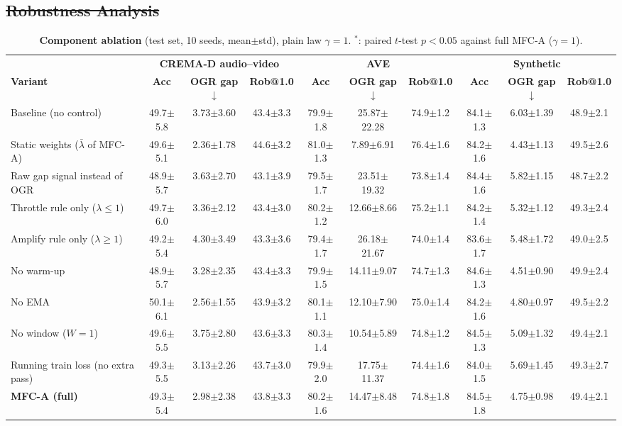 \documentclass[fleqn,10pt]{wlscirep}
\newcommand{\pmm}{$\pm$} %
\providecommand{\DIFdel}[1]{{\protect\color{red}\sout{#1}}} %
\providecommand{\DIFaddbegin}{} %
\providecommand{\DIFdelbegin}{} %
\providecommand{\DIFdelend}{} %
\begin{document}
\DIFdelbegin \subsection{\DIFdel{Robustness Analysis}}
\addtocounter{subsection}{-1}%
\DIFdelend \DIFaddbegin \begin{table}[t]
\caption{\textbf{Component ablation} (test set, 10 seeds, mean\pmm std), plain law $\gamma{=}1$. $^{*}$: paired $t$-test $p<0.05$ against full MFC-A ($\gamma{=}1$).}
\label{tab:ablation}
\centering
\footnotesize
\setlength{\tabcolsep}{3pt}
\begin{tabular}{@{}lccc@{\hskip 8pt}ccc@{\hskip 8pt}ccc@{}}
\toprule
& \multicolumn{3}{c}{\textbf{CREMA-D audio--video}} & \multicolumn{3}{c}{\textbf{AVE}} & \multicolumn{3}{c}{\textbf{Synthetic}} \\
\cmidrule(lr){2-4}\cmidrule(lr){5-7}\cmidrule(lr){8-10}
\textbf{Variant} & \textbf{Acc} & \textbf{OGR gap}$\downarrow$ & \textbf{Rob@1.0} & \textbf{Acc} & \textbf{OGR gap}$\downarrow$ & \textbf{Rob@1.0} & \textbf{Acc} & \textbf{OGR gap}$\downarrow$ & \textbf{Rob@1.0} \\ \midrule
Baseline (no control) & 49.7$\pm$5.8 & 3.73$\pm$3.60 & 43.4$\pm$3.3 & 79.9$\pm$1.8 & 25.87$\pm$22.28 & 74.9$\pm$1.2 & 84.1$\pm$1.3 & 6.03$\pm$1.39 & 48.9$\pm$2.1 \\
Static weights ($\bar\lambda$ of MFC-A) & 49.6$\pm$5.1 & 2.36$\pm$1.78 & 44.6$\pm$3.2 & 81.0$\pm$1.3 & 7.89$\pm$6.91 & 76.4$\pm$1.6 & 84.2$\pm$1.6 & 4.43$\pm$1.13 & 49.5$\pm$2.6 \\
Raw gap signal instead of OGR & 48.9$\pm$5.7 & 3.63$\pm$2.70 & 43.1$\pm$3.9 & 79.5$\pm$1.7 & 23.51$\pm$19.32 & 73.8$\pm$1.4 & 84.4$\pm$1.6 & 5.82$\pm$1.15 & 48.7$\pm$2.2 \\
Throttle rule only ($\lambda\le1$) & 49.7$\pm$6.0 & 3.36$\pm$2.12 & 43.4$\pm$3.0 & 80.2$\pm$1.2 & 12.66$\pm$8.66 & 75.2$\pm$1.1 & 84.2$\pm$1.4 & 5.32$\pm$1.12 & 49.3$\pm$2.4 \\
Amplify rule only ($\lambda\ge1$) & 49.2$\pm$5.4 & 4.30$\pm$3.49 & 43.3$\pm$3.6 & 79.4$\pm$1.7 & 26.18$\pm$21.67 & 74.0$\pm$1.4 & 83.6$\pm$1.7 & 5.48$\pm$1.72 & 49.0$\pm$2.5 \\
No warm-up & 48.9$\pm$5.7 & 3.28$\pm$2.35 & 43.4$\pm$3.3 & 79.9$\pm$1.5 & 14.11$\pm$9.07 & 74.7$\pm$1.3 & 84.6$\pm$1.3 & 4.51$\pm$0.90 & 49.9$\pm$2.4 \\
No EMA & 50.1$\pm$6.1 & 2.56$\pm$1.55 & 43.9$\pm$3.2 & 80.1$\pm$1.1 & 12.10$\pm$7.90 & 75.0$\pm$1.4 & 84.2$\pm$1.6 & 4.80$\pm$0.97 & 49.5$\pm$2.2 \\
No window ($W{=}1$) & 49.6$\pm$5.5 & 3.75$\pm$2.80 & 43.6$\pm$3.3 & 80.3$\pm$1.4 & 10.54$\pm$5.89 & 74.8$\pm$1.2 & 84.5$\pm$1.3 & 5.09$\pm$1.32 & 49.4$\pm$2.1 \\
Running train loss (no extra pass) & 49.3$\pm$5.5 & 3.13$\pm$2.26 & 43.7$\pm$3.0 & 79.9$\pm$2.0 & 17.75$\pm$11.37 & 74.4$\pm$1.6 & 84.0$\pm$1.5 & 5.69$\pm$1.45 & 49.3$\pm$2.7 \\
\textbf{MFC-A (full)} & 49.3$\pm$5.4 & 2.98$\pm$2.38 & 43.8$\pm$3.3 & 80.2$\pm$1.6 & 14.47$\pm$8.48 & 74.8$\pm$1.8 & 84.5$\pm$1.8 & 4.75$\pm$0.98 & 49.4$\pm$2.1 \\
\bottomrule
\end{tabular}
\end{table}
\end{document}
